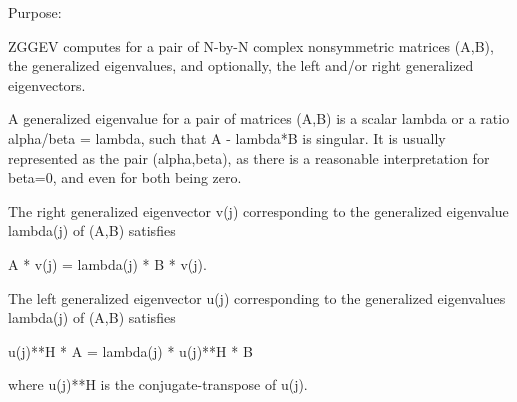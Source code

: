  \begin{DoxyParagraph}{Purpose\+: }
\begin{DoxyVerb} ZGGEV computes for a pair of N-by-N complex nonsymmetric matrices
 (A,B), the generalized eigenvalues, and optionally, the left and/or
 right generalized eigenvectors.

 A generalized eigenvalue for a pair of matrices (A,B) is a scalar
 lambda or a ratio alpha/beta = lambda, such that A - lambda*B is
 singular. It is usually represented as the pair (alpha,beta), as
 there is a reasonable interpretation for beta=0, and even for both
 being zero.

 The right generalized eigenvector v(j) corresponding to the
 generalized eigenvalue lambda(j) of (A,B) satisfies

              A * v(j) = lambda(j) * B * v(j).

 The left generalized eigenvector u(j) corresponding to the
 generalized eigenvalues lambda(j) of (A,B) satisfies

              u(j)**H * A = lambda(j) * u(j)**H * B

 where u(j)**H is the conjugate-transpose of u(j).\end{DoxyVerb}
 
\end{DoxyParagraph}


